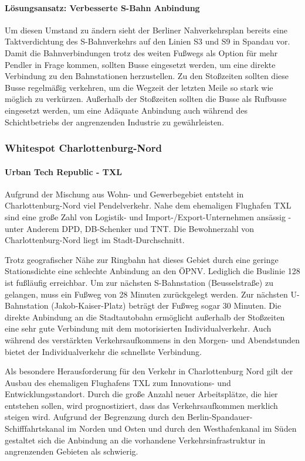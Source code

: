 \paragraph{Lösungsansatz: Verbesserte S-Bahn Anbindung}
Um diesen Umstand zu ändern sieht der Berliner Nahverkehrsplan bereits eine Taktverdichtung des S-Bahnverkehrs auf den Linien S3 und S9 in Spandau vor. Damit die Bahnverbindungen trotz des weiten Fußwegs als Option für mehr Pendler in Frage kommen, sollten Busse eingesetzt werden, um eine direkte Verbindung zu den Bahnstationen herzustellen. Zu den Stoßzeiten sollten diese Busse regelmäßig verkehren, um die Wegzeit der letzten Meile so stark wie möglich zu verkürzen. Außerhalb der Stoßzeiten sollten die Busse als Rufbusse eingesetzt werden, um eine Adäquate Anbindung auch während des Schichtbetriebs der angrenzenden Industrie zu gewährleisten.










\subsubsection{Whitespot Charlottenburg-Nord}
\paragraph{Urban Tech Republic - TXL}
Aufgrund der Mischung aus Wohn- und Gewerbegebiet entsteht in Charlottenburg-Nord viel Pendelverkehr. Nahe dem ehemaligen Flughafen TXL sind eine große Zahl von Logistik- und Import-/Export-Unternehmen ansässig - unter Anderem DPD, DB-Schenker und TNT. Die Bewohnerzahl von Charlottenburg-Nord liegt im Stadt-Durchschnitt.

Trotz geografischer Nähe zur Ringbahn hat dieses Gebiet durch eine geringe Stationsdichte eine schlechte Anbindung an den ÖPNV. Lediglich die Buslinie 128 ist fußläufig erreichbar. Um zur nächsten S-Bahnstation (Beusselstraße) zu gelangen, muss ein Fußweg von 28 Minuten zurückgelegt werden. Zur nächsten U-Bahnstation (Jakob-Kaiser-Platz) beträgt der Fußweg sogar 30 Minuten. Die direkte Anbindung an die Stadtautobahn ermöglicht außerhalb der Stoßzeiten eine sehr gute Verbindung mit dem motorisierten Individualverkehr. Auch während des verstärkten Verkehrsaufkommens in den Morgen- und Abendstunden bietet der Individualverkehr die schnellste Verbindung.

Als besondere Herausforderung für den Verkehr in Charlottenburg Nord gilt der Ausbau des ehemaligen Flughafens TXL zum Innovations- und Entwicklungsstandort. Durch die große Anzahl neuer Arbeitsplätze, die hier entstehen sollen, wird prognostiziert, dass das Verkehrsaufkommen merklich steigen wird. Aufgrund der Begrenzung durch den Berlin-Spandauer-Schifffahrtskanal im Norden und Osten und durch den Westhafenkanal im Süden gestaltet sich die Anbindung an die vorhandene Verkehrsinfrastruktur in angrenzenden Gebieten als schwierig.


